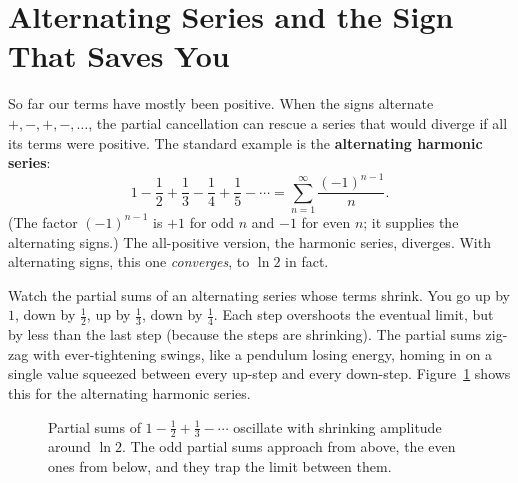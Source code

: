 \section{Alternating Series and the Sign That Saves You}
\label{ch29:alternating}

So far our terms have mostly been positive. When the signs alternate $+,-,+,-,\dots$, the partial cancellation can rescue a series that would diverge if all its terms were positive. The standard example is the \textbf{alternating harmonic series}:
\[
1 - \frac{1}{2} + \frac{1}{3} - \frac{1}{4} + \frac{1}{5} - \cdots = \sum_{n=1}^\infty \frac{(-1)^{n-1}}{n}.
\]
(The factor $(-1)^{n-1}$ is $+1$ for odd $n$ and $-1$ for even $n$; it supplies the alternating signs.) The all-positive version, the harmonic series, diverges. With alternating signs, this one \emph{converges}, to $\ln 2$ in fact.

\begin{intuitionbox}
Watch the partial sums of an alternating series whose terms shrink. You go up by $1$, down by $\tfrac12$, up by $\tfrac13$, down by $\tfrac14$. Each step overshoots the eventual limit, but by less than the last step (because the steps are shrinking). The partial sums zig-zag with ever-tightening swings, like a pendulum losing energy, homing in on a single value squeezed between every up-step and every down-step. Figure~\ref{ch29:fig-alternating} shows this for the alternating harmonic series.
\end{intuitionbox}

\begin{figure}[H]
\centering
{}
\caption{Partial sums of $1 - \tfrac12 + \tfrac13 - \cdots$ oscillate with shrinking amplitude around $\ln 2$. The odd partial sums approach from above, the even ones from below, and they trap the limit between them.}
\label{ch29:fig-alternating}
\end{figure}

